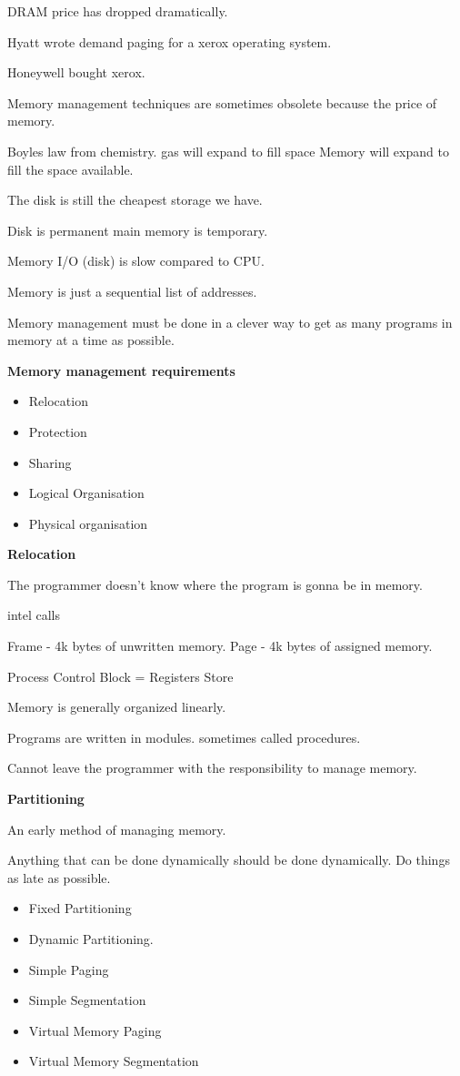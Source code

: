 \documentclass{article}
\begin{document}
DRAM price has dropped dramatically.

Hyatt wrote demand paging for a xerox operating system.

Honeywell bought xerox.

Memory management techniques are sometimes obsolete because the price of memory.

Boyles law from chemistry. gas will expand to fill space
Memory will expand to fill the space available. 

The disk is still the cheapest storage we have.

Disk is permanent main memory is temporary. 

Memory I/O (disk) is slow compared to CPU.

Memory is just a sequential list of addresses.

Memory management must be done in a clever way to get as many programs in memory at a time as possible. 

{\bf Memory management requirements}

\begin{itemize}
\item Relocation
\item Protection
\item Sharing
\item Logical Organisation
\item Physical organisation
\end{itemize}

{\bf Relocation}

The programmer doesn't know where the program is gonna be in memory.

intel calls

Frame - 4k bytes of unwritten memory.
Page - 4k bytes of assigned memory.

Process Control Block = Registers Store

Memory is generally organized linearly.

Programs are written in modules. sometimes called procedures. 

Cannot leave the programmer with the responsibility to manage memory. 

{\bf Partitioning}

An early method of managing memory.

Anything that can be done dynamically should be done dynamically.
Do things as late as possible. 

\begin{itemize}
\item Fixed Partitioning
\item Dynamic Partitioning.
\item Simple Paging
\item Simple Segmentation
\item Virtual Memory Paging
\item Virtual Memory Segmentation
\end{itemize}
\end{document}
